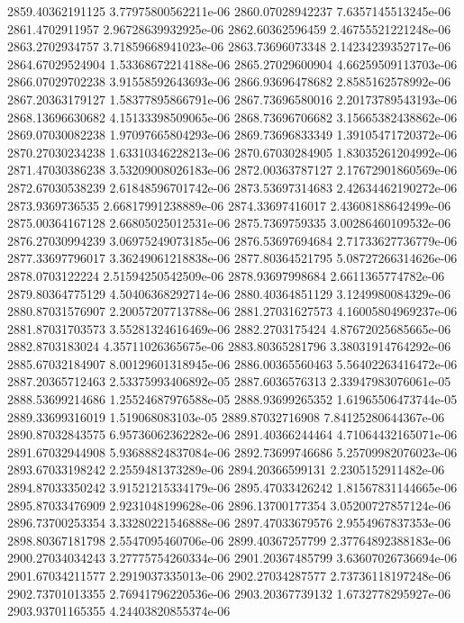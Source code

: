 {2859.40362191125 3.77975800562211e-06
2860.07028942237 7.6357145513245e-06
2861.4702911957 2.96728639932925e-06
2862.60362596459 2.46755521221248e-06
2863.2702934757 3.71859668941023e-06
2863.73696073348 2.14234239352717e-06
2864.67029524904 1.53368672214188e-06
2865.27029600904 4.66259509113703e-06
2866.07029702238 3.91558592643693e-06
2866.93696478682 2.8585162578992e-06
2867.20363179127 1.58377895866791e-06
2867.73696580016 2.20173789543193e-06
2868.13696630682 4.15133398509065e-06
2868.73696706682 3.15665382438862e-06
2869.07030082238 1.97097665804293e-06
2869.73696833349 1.39105471720372e-06
2870.27030234238 1.63310346228213e-06
2870.67030284905 1.83035261204992e-06
2871.47030386238 3.53209008026183e-06
2872.00363787127 2.17672901860569e-06
2872.67030538239 2.61848596701742e-06
2873.53697314683 2.42634462190272e-06
2873.9369736535 2.66817991238889e-06
2874.33697416017 2.43608188642499e-06
2875.00364167128 2.66805025012531e-06
2875.7369759335 3.00286460109532e-06
2876.27030994239 3.06975249073185e-06
2876.53697694684 2.71733627736779e-06
2877.33697796017 3.36249061218838e-06
2877.80364521795 5.08727266314626e-06
2878.0703122224 2.51594250542509e-06
2878.93697998684 2.6611365774782e-06
2879.80364775129 4.50406368292714e-06
2880.40364851129 3.1249980084329e-06
2880.87031576907 2.20057207713788e-06
2881.27031627573 4.16005804969237e-06
2881.87031703573 3.55281324616469e-06
2882.2703175424 4.87672025685665e-06
2882.8703183024 4.35711026365675e-06
2883.80365281796 3.38031914764292e-06
2885.67032184907 8.00129601318945e-06
2886.00365560463 5.56402263416472e-06
2887.20365712463 2.53375993406892e-05
2887.6036576313 2.33947983076061e-05
2888.53699214686 1.25524687976588e-05
2888.93699265352 1.61965506473744e-05
2889.33699316019 1.519068083103e-05
2889.87032716908 7.84125280644367e-06
2890.87032843575 6.95736062362282e-06
2891.40366244464 4.71064432165071e-06
2891.67032944908 5.93688824837084e-06
2892.73699746686 5.25709982076023e-06
2893.67033198242 2.2559481373289e-06
2894.20366599131 2.2305152911482e-06
2894.87033350242 3.91521215334179e-06
2895.47033426242 1.81567831144665e-06
2895.87033476909 2.9231048199628e-06
2896.13700177354 3.05200727857124e-06
2896.73700253354 3.33280221546888e-06
2897.47033679576 2.9554967837353e-06
2898.80367181798 2.5547095460706e-06
2899.40367257799 2.37764892388183e-06
2900.27034034243 3.27775754260334e-06
2901.20367485799 3.63607026736694e-06
2901.67034211577 2.2919037335013e-06
2902.27034287577 2.73736118197248e-06
2902.73701013355 2.76941796220536e-06
2903.20367739132 1.6732778295927e-06
2903.93701165355 4.24403820855374e-06
}
